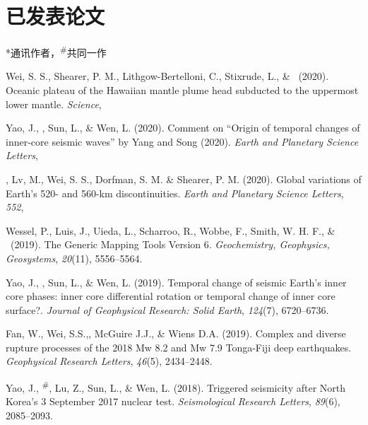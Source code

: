 \newcommand{\Revision}{\textit{正在审稿}}
\newcommand{\CS}{*} %
\newcommand{\CF}{\textsuperscript{\#}} %

\section*{已发表论文}
\CS 通讯作者，\CF 共同一作

\begin{etaremune}
\item Wei, S. S., Shearer, P. M., Lithgow-Bertelloni, C., Stixrude, L., \& \Tian\ (2020).
	Oceanic plateau of the Hawaiian mantle plume head subducted to the uppermost lower mantle.
	\textit{Science}, \\
\item Yao, J., \Tian, Sun, L., \& Wen, L. (2020).
	Comment on ``Origin of temporal changes of inner-core seismic waves'' by Yang and Song (2020).
	\textit{Earth and Planetary Science Letters}, \\
\item \Tian, Lv, M., Wei, S. S., Dorfman, S. M. \& Shearer, P. M. (2020).
	Global variations of Earth's 520- and 560-km discontinuities.
	\textit{Earth and Planetary Science Letters}, \textit{552},
\item
    Wessel, P., Luis, J., Uieda, L., Scharroo, R., Wobbe, F., Smith, W. H. F., \& \Tian\ (2019).
    The Generic Mapping Tools Version 6.
    \textit{Geochemistry, Geophysics, Geosystems}, \textit{20}(11), 5556--5564.
\item
    Yao, J., \Tian, Sun, L., \& Wen, L. (2019).
    Temporal change of seismic Earth's inner core phases: inner core differential rotation or temporal change of inner core surface?.
    \textit{Journal of Geophysical Research: Solid Earth}, \textit{124}(7), 6720--6736.
\item
    Fan, W., Wei, S.S.,\Tian, McGuire J.J., \& Wiens D.A. (2019).
    Complex and diverse rupture processes of the 2018 Mw 8.2 and Mw 7.9 Tonga-Fiji deep earthquakes.
    \textit{Geophysical Research Letters}, \textit{46}(5), 2434--2448.
\item
    Yao, J., \Tian\CF, Lu, Z., Sun, L., \& Wen, L. (2018).
    Triggered seismicity after North Korea's 3 September 2017 nuclear test.
    \textit{Seismological Research Letters}, \textit{89}(6), 2085--2093.

\end{etaremune}
